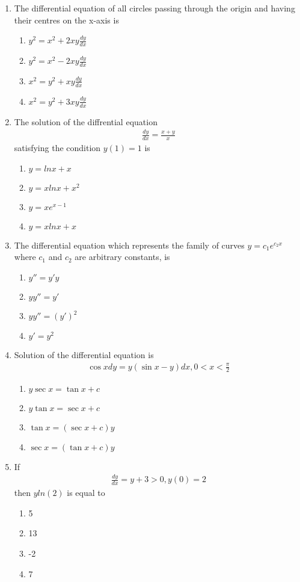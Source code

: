 \begin{enumerate}[label=\arabic*.,ref=\thesubsection.\theenumi]
\item The differential equation of all circles passing through the origin and having their centres on the x-axis is
\begin{enumerate}
\item $y^2 = x^2 + 2xy\frac{dy}{dx}$
\item $y^2 = x^2 - 2xy\frac{dy}{dx}$
\item $x^2 = y^2 + xy\frac{dy}{dx}$
\item $x^2 = y^2 + 3xy\frac{dy}{dx}$
\end{enumerate}

\item The solution of the diffrential equation
\begin{align*}
\frac{dy}{dx} = \frac{x + y}{x}
\end{align*}
satisfying the condition $y(1) = 1$ is
\begin{enumerate}
\item $y = lnx + x$
\item $y = xlnx + x^2$
\item $y = xe^{x - 1}$
\item $y = xlnx + x$
\end{enumerate}

\item The differential equation which represents the family of curves $y = c_1e^{c_2x}$ where $c_1$ and $c_2$ are arbitrary constants, is
\begin{enumerate}
\item $y'' = y'y$
\item $yy'' = y'$
\item $yy'' = (y')^2$
\item $y' = y^2$
\end{enumerate} 

\item Solution of the differential equation is
\begin{align*}
\cos xdy = y(\sin x - y)dx, 0 < x < \frac{\pi}{2}
\end{align*}
\begin{enumerate}
\item $y\sec x = \tan x + c$
\item $y\tan x = \sec x + c$
\item $\tan x = (\sec x + c)y$
\item $\sec x = (\tan x + c)y$
\end{enumerate}

\item If 
\begin{align*}
\frac{dy}{dx} = y + 3 > 0, y(0) = 2
\end{align*}
then $yln(2)$ is equal to
\begin{enumerate}
\item 5
\item 13
\item -2
\item 7
\end{enumerate}


\end{enumerate}
